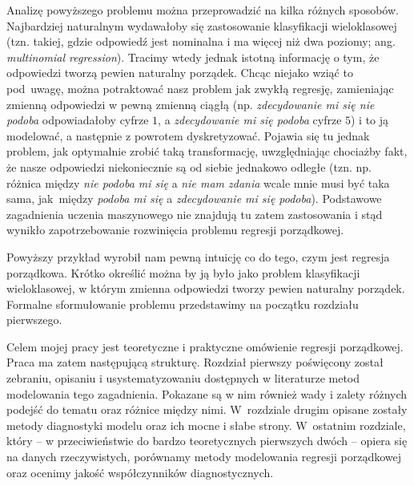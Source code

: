 \documentclass{mini}
\begin{document}
Analizę powyższego problemu można przeprowadzić na kilka różnych sposobów. Najbardziej naturalnym wydawałoby się zastosowanie klasyfikacji wieloklasowej (tzn. takiej, gdzie odpowiedź jest nominalna i ma więcej niż dwa poziomy; ang. \textit{multinomial regression}). Tracimy wtedy jednak istotną informację o tym, że odpowiedzi tworzą pewien naturalny porządek. Chcąc niejako wziąć to pod~uwagę, można potraktować nasz problem jak zwykłą regresję, zamieniając zmienną odpowiedzi w pewną zmienną ciągłą (np. \textit{zdecydowanie mi się nie podoba} odpowiadałoby cyfrze $1$, a \textit{zdecydowanie mi się podoba} cyfrze $5$) i to ją modelować, a następnie z powrotem dyskretyzować. Pojawia się tu jednak problem, jak optymalnie zrobić taką transformację, uwzględniając chociażby fakt, że nasze odpowiedzi niekoniecznie są od siebie jednakowo odległe (tzn. np. różnica między \textit{nie podoba mi się} a \textit{nie mam zdania} wcale mnie musi być taka sama, jak~między \textit{podoba mi się} a \textit{zdecydowanie mi się podoba}). Podstawowe zagadnienia uczenia maszynowego nie znajdują tu zatem zastosowania i stąd wynikło zapotrzebowanie rozwinięcia problemu regresji porządkowej. 

Powyższy przykład wyrobił nam pewną intuicję co do tego, czym jest regresja porządkowa. Krótko określić można by ją było jako problem klasyfikacji wieloklasowej, w którym zmienna odpowiedzi tworzy pewien naturalny porządek. Formalne sformułowanie problemu przedstawimy na początku rozdziału pierwszego.

Celem mojej pracy jest teoretyczne i praktyczne omówienie regresji porządkowej. Praca ma zatem następującą strukturę. Rozdział pierwszy poświęcony został zebraniu, opisaniu i usystematyzowaniu dostępnych w literaturze metod modelowania tego zagadnienia. Pokazane są w nim również wady i zalety różnych podejść do tematu oraz różnice między nimi. W~rozdziale drugim opisane zostały metody diagnostyki modelu oraz ich mocne i słabe strony. W~ostatnim rozdziale, który -- w przeciwieństwie do bardzo teoretycznych pierwszych dwóch -- opiera się na danych rzeczywistych, porównamy metody modelowania regresji porządkowej oraz ocenimy jakość współczynników diagnostycznych.       


%
\end{document}
